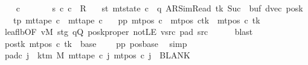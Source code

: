 \begin{isabellebody}
\ \ \isamarkupfalse%
\ c{}\ \isanewline
\ \ \ \ \ \ s{}{\isacharcolon}{\kern0pt}\ {\isachardoublequoteopen}{\isacharparenleft}{\kern0pt}c{\isacharprime}{\kern0pt}{\isacharcomma}{\kern0pt}\ c{}{\isacharparenright}{\kern0pt}\ {\isasymin}\ R{\isacharprime}{\kern0pt}{\isachardoublequoteclose}\isanewline
\ \ \ st{}{\isacharcolon}{\kern0pt}\ {\isachardoublequoteopen}mt{\isacharunderscore}{\kern0pt}state\ c{}\ {\isacharequal}{\kern0pt}\ {\isacharparenleft}{\kern0pt}q{\isacharcomma}{\kern0pt}\ AR{\isacharunderscore}{\kern0pt}SimRead{\isacharcomma}{\kern0pt}\ tk{\isacharcomma}{\kern0pt}\ Suc\ {}{\isacharcomma}{\kern0pt}\ buf{\isacharcomma}{\kern0pt}\ dvec{\isacharcomma}{\kern0pt}\ posk{\isacharparenright}{\kern0pt}{\isachardoublequoteclose}\isanewline
\ \ \ tp{}{\isacharcolon}{\kern0pt}\ {\isachardoublequoteopen}mt{\isacharunderscore}{\kern0pt}tape\ c{}\ {\isacharequal}{\kern0pt}\ mt{\isacharunderscore}{\kern0pt}tape\ c{\isacharprime}{\kern0pt}{\isachardoublequoteclose}\isanewline
\ \ \ pp{}{\isacharcolon}{\kern0pt}\ {\isachardoublequoteopen}mt{\isacharunderscore}{\kern0pt}pos\ c{}\ {\isacharequal}{\kern0pt}\ {\isacharparenleft}{\kern0pt}mt{\isacharunderscore}{\kern0pt}pos\ c{\isacharprime}{\kern0pt}{\isacharparenright}{\kern0pt}{\isacharparenleft}{\kern0pt}tk\ {\isacharcolon}{\kern0pt}{\isacharequal}{\kern0pt}\ mt{\isacharunderscore}{\kern0pt}pos\ c{\isacharprime}{\kern0pt}\ tk\ {\isacharminus}{\kern0pt}\ {}{\isacharparenright}{\kern0pt}{\isachardoublequoteclose}\isanewline
\ \ \ \ \isamarkupfalse%
\ leaf{\isacharunderscore}{\kern0pt}lb{}{\isacharbrackleft}{\kern0pt}OF\ vM\ stg\ qQ\ posk{\isacharunderscore}{\kern0pt}proper\ notLE\ vsrc\ pad{}\ src{}{\isacharbrackright}{\kern0pt}\isanewline
\ \ \ \ \isamarkupfalse%
\ blast\isanewline
\ \ \isamarkupfalse%
\ pos{}{\isacharunderscore}{\kern0pt}tk{\isacharcolon}{\kern0pt}\ {\isachardoublequoteopen}mt{\isacharunderscore}{\kern0pt}pos\ c{}\ tk\ {\isacharequal}{\kern0pt}\ base\ {\isacharminus}{\kern0pt}\ {}{\isachardoublequoteclose}\ \isamarkupfalse%
\ pp{}\ pos{\isacharunderscore}{\kern0pt}base\ \isamarkupfalse%
\ simp\isanewline
\ \ \isamarkupfalse%
\ pad{\isacharunderscore}{\kern0pt}c{}{\isacharcolon}{\kern0pt}\ {\isachardoublequoteopen}{\isasymforall}j\ {\isasymge}\ k{\isacharunderscore}{\kern0pt}tm\ M{\isachardot}{\kern0pt}\ mt{\isacharunderscore}{\kern0pt}tape\ c{}\ j\ {\isacharparenleft}{\kern0pt}mt{\isacharunderscore}{\kern0pt}pos\ c{}\ j{\isacharparenright}{\kern0pt}\ {\isacharequal}{\kern0pt}\ BLANK{}{\isachardoublequoteclose}\isanewline

\end{isabellebody}

